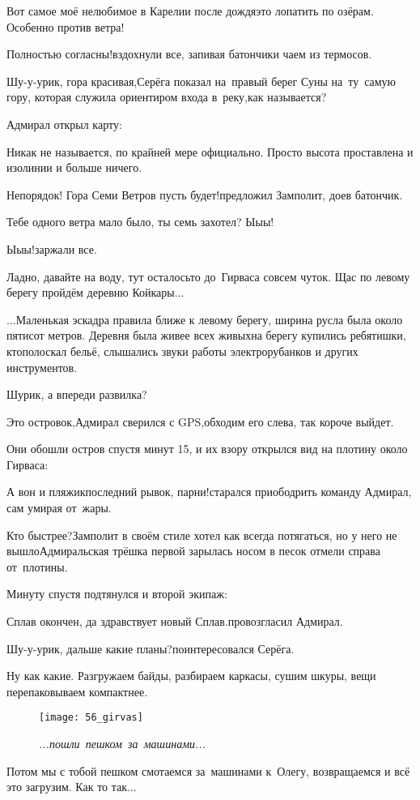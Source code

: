 \diagdash Вот самое моё нелюбимое в Карелии после дождя\mdash это лопатить по озёрам. Особенно против ветра!

\diagdash Полностью согласны!\mdash вздохнули все, запивая батончики чаем из термосов. 

\diagdash Шу-у-урик, гора красивая,\mdash Серёга показал на~правый берег Суны на~ту~самую гору, которая служила ориентиром входа в~реку,\mdash как называется?

Адмирал открыл карту:

\diagdash Никак не называется, по крайней мере официально. Просто высота проставлена и изолинии и больше ничего.

\diagdash Непорядок! Гора Семи Ветров пусть будет!\mdash предложил Замполит, доев батончик.

\diagdash Тебе одного ветра мало было, ты семь захотел? Ы\sdash ы\sdash ы!

\diagdash Ы\sdash ы\sdash ы!\mdash заржали все.

\diagdash Ладно, давайте на воду, тут осталось\sdash то до~Гирваса совсем чуток. Щас по левому берегу пройдём деревню Койкары$\ldots$

$\ldots$Маленькая эскадра правила ближе к левому берегу, ширина русла была около пятисот метров. Деревня была живее всех живых\mdash на берегу купились ребятишки, кто\sdash полоскал бельё, слышались звуки работы электрорубанков и других инструментов.

\diagdash Шурик, а впереди развилка?

\diagdash Это островок,\mdash Адмирал сверился с GPS,\mdash обходим его слева, так короче выйдет.

Они обошли остров спустя минут 15, и их взору открылся вид на плотину около Гирваса:

\diagdash А вон и пляжик\mdash последний рывок, парни!\mdash старался приободрить команду Адмирал, сам умирая от~жары.

\diagdash Кто быстрее?\mdash Замполит в своём стиле хотел как всегда потягаться, но у него не вышло\mdash Адмиральская трёшка первой зарылась носом в песок отмели справа от~плотины.

Минуту спустя подтянулся и второй экипаж:

\diagdash Сплав окончен, да здравствует новый Сплав.\mdash провозгласил Адмирал.

\diagdash Шу-у-урик, дальше какие планы?\mdash поинтересовался Серёга.

\diagdash Ну как какие. Разгружаем байды, разбираем каркасы, сушим шкуры, вещи перепаковываем компактнее. \begin{wrapfigure}[18]{l}{0.5\textwidth}
	\centering
	\texttt{[image: 56\_girvas]}
	\caption{\small\textit{...пошли~пешком~за~машинами...}}
\end{wrapfigure} Потом мы с тобой пешком смотаемся за~машинами к~Олегу, возвращаемся и всё это загрузим. Как то так$\ldots$

